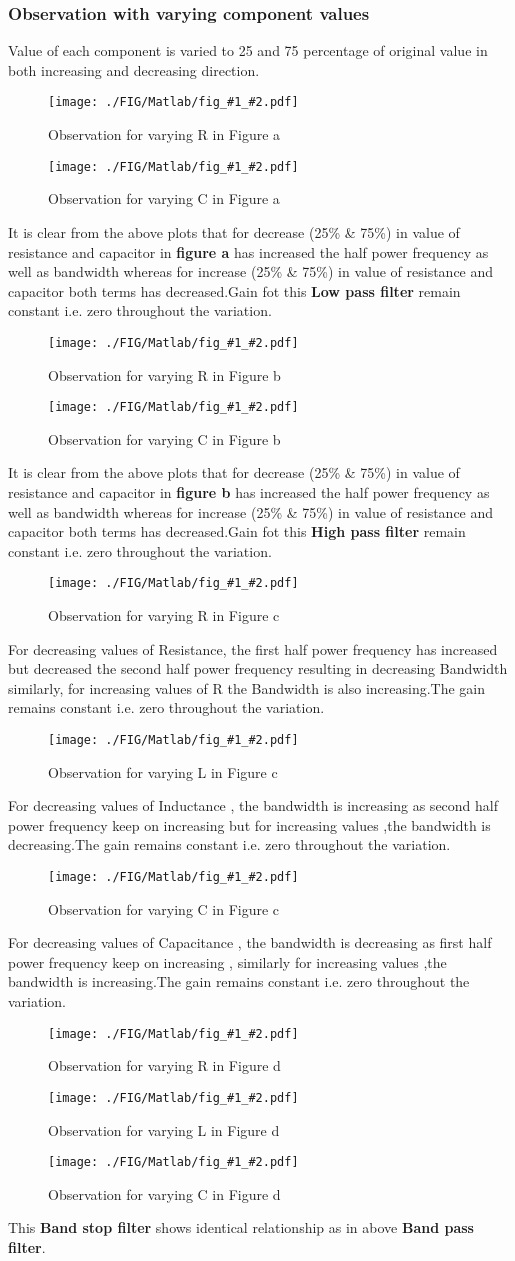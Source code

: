 \documentclass[a4paper,11pt]{article}
\newcommand{\varfig}[2]
{
\begin{figure}[H]
    \centering
    \texttt{[image: ./FIG/Matlab/fig\_\#1\_\#2.pdf]}
    \caption{Observation for varying #2 in Figure #1}
\end{figure}
}
\begin{document}
\subsubsection{Observation with varying component values}
Value of each component is varied to 25 and 75 percentage of original value  in both increasing and decreasing direction.

\varfig{a}{R}
\varfig{a}{C}

It is clear from the above plots that for decrease (25\%  \& 75\%) in value of resistance and capacitor in \textbf{figure a} has increased the half power frequency as well as bandwidth whereas for increase (25\% \& 75\%)  in value of resistance and capacitor both terms has decreased.Gain fot this \textbf{Low pass filter} remain constant i.e. zero  throughout the variation.

\varfig{b}{R}
\varfig{b}{C}

It is clear from the above plots that for decrease (25\%  \& 75\%) in value of resistance and capacitor in \textbf{figure b} has increased the half power frequency as well as bandwidth whereas for increase (25\% \& 75\%)  in value of resistance and capacitor both terms has decreased.Gain fot this \textbf{High pass filter} remain constant i.e. zero  throughout the variation.

\varfig{c}{R}

For decreasing values of Resistance, the first half power frequency has increased  but decreased the second half power frequency resulting in decreasing Bandwidth similarly, for increasing values of R the Bandwidth is also increasing.The gain remains constant i.e. zero  throughout the variation.

\varfig{c}{L}

For decreasing values of Inductance , the bandwidth is increasing as  second half power frequency keep on increasing but for increasing values ,the bandwidth is decreasing.The gain remains constant i.e. zero  throughout the variation.


\varfig{c}{C}
For decreasing values of Capacitance , the bandwidth is decreasing as first half power frequency keep on increasing , similarly for increasing values ,the bandwidth is increasing.The gain remains constant i.e. zero  throughout the variation.

\varfig{d}{R}
\varfig{d}{L}
\varfig{d}{C}

This \textbf{Band stop filter}  shows identical relationship  as in above \textbf{Band pass filter}.\\
\end{document}
